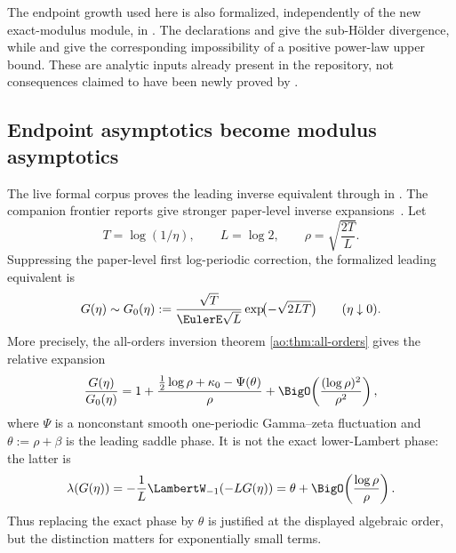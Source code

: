 The endpoint growth used here is also formalized, independently of the new
exact-modulus module, in .  The declarations
 and
 give the
sub-H\"older divergence, while
 and
 give the
corresponding impossibility of a positive power-law upper bound.  These are
analytic inputs already present in the repository, not consequences claimed
to have been newly proved by .

\subsection{Endpoint asymptotics become modulus asymptotics}

The live formal corpus proves the leading inverse equivalent through
 in
.  The companion frontier reports give
stronger paper-level inverse expansions\ \cite{is:p1:ProveItPrimary}.
Let
\begin{equation}\label{co:eq:T-L-rho}
 T=\log(1/\eta),
 \qquad L=\log2,
 \qquad \rho=\sqrt{\frac{2T}{L}}.
\end{equation}
Suppressing the paper-level first log-periodic correction, the formalized leading
equivalent is
\begin{equation}\label{co:eq:G-leading}
 G(\eta)\sim
 G_0(\eta):=
 \frac{\sqrt T}{\EulerE\sqrt L}
 \exp\!\bigl(-\sqrt{2LT}\bigr)
 \qquad(\eta\downarrow0).
\end{equation}
More precisely, the all-orders inversion theorem
\cref{ao:thm:all-orders} gives the relative expansion
\begin{equation}\label{co:eq:G-periodic-correction}
 \frac{G(\eta)}{G_0(\eta)}
 =1+
 \frac{\frac12\log\rho+\kappa_0-\Psi(\theta)}{\rho}
 +\BigO\!\left(\frac{(\log\rho)^2}{\rho^2}\right),
\end{equation}
where $\Psi$ is a nonconstant smooth one-periodic Gamma--zeta fluctuation and
$\theta:=\rho+\beta$ is the leading saddle phase.  It is not the exact
lower-Lambert phase: the latter is
\[
 \lambda(G(\eta))=-\frac1L\LambertW_{-1}(-LG(\eta))
 =\theta+\BigO\!\left(\frac{\log\rho}{\rho}\right).
\]
Thus replacing the exact phase by $\theta$ is justified at the displayed
algebraic order, but the distinction matters for exponentially small terms.

